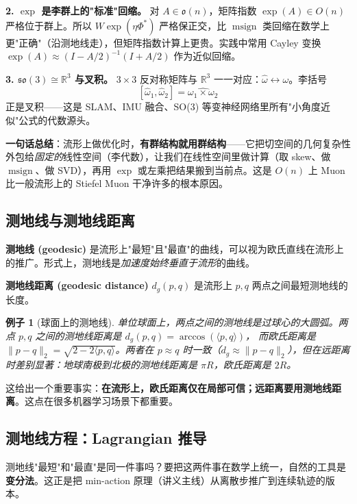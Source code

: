\documentclass[11pt,a4paper]{article}
\theoremstyle{mythm}
\theoremstyle{mydef}
\newtheorem{example}[theorem]{例子}
\newcommand{\R}{\mathbb{R}}
\newcommand{\msign}{\operatorname{msign}}
\newcommand{\inner}[2]{\langle #1, #2 \rangle}
\begin{document}
\textbf{2. $\exp$ 是李群上的"标准"回缩。}
对 $A\in\mathfrak{o}(n)$，矩阵指数 $\exp(A) \in O(n)$ 严格位于群上。所以 $W\exp(\eta\Phi^*)$ 严格保正交，比 $\msign$ 类回缩在数学上更"正确"（沿测地线走），但矩阵指数计算上更贵。实践中常用 Cayley 变换 $\exp(A) \approx (I-A/2)^{-1}(I+A/2)$ 作为近似回缩。

\textbf{3. $\mathfrak{so}(3) \cong \R^3$ 与叉积。}
$3\times 3$ 反对称矩阵与 $\R^3$ 一一对应：$\hat\omega \leftrightarrow \omega$。李括号
$$[\hat\omega_1, \hat\omega_2] = \widehat{\omega_1 \times \omega_2}$$
正是叉积——这是 SLAM、IMU 融合、SO(3) 等变神经网络里所有"小角度近似"公式的代数源头。

\medskip
\textbf{一句话总结}：流形上做优化时，\textbf{有群结构就用群结构}——它把切空间的几何复杂性外包给\emph{固定的}线性空间（李代数），让我们在线性空间里做计算（取 skew、做 $\msign$、做 SVD），再用 $\exp$ 或左乘把结果搬到当前点。这是 $O(n)$ 上 Muon 比一般流形上的 Stiefel Muon 干净许多的根本原因。

\subsection{测地线与测地线距离}

\textbf{测地线 (geodesic)} 是流形上"最短"且"最直"的曲线，可以视为欧氏直线在流形上的推广。形式上，测地线是\emph{加速度始终垂直于流形}的曲线。

\textbf{测地线距离 (geodesic distance)} $d_g(p, q)$ 是流形上 $p,q$ 两点之间最短测地线的长度。

\begin{example}[球面上的测地线]
单位球面上，两点之间的测地线是过球心的大圆弧。两点 $p,q$ 之间的测地线距离是
$d_g(p, q) = \arccos(\inner{p}{q})$，
而欧氏距离是 $\|p-q\|_2 = \sqrt{2 - 2\inner{p}{q}}$。两者在 $p\approx q$ 时一致（$d_g\approx \|p-q\|_2$），但在远距离时差别显著：地球南极到北极的测地线距离是 $\pi R$，欧氏距离是 $2R$。
\end{example}

这给出一个重要事实：\textbf{在流形上，欧氏距离仅在局部可信；远距离要用测地线距离}。这点在很多机器学习场景下都重要。

\subsection{测地线方程：Lagrangian 推导}\label{sec:geodesic-eq}

测地线"最短"和"最直"是同一件事吗？要把这两件事在数学上统一，自然的工具是\textbf{变分法}。这正是把 min-action 原理（讲义主线）从离散步推广到连续轨迹的版本。
\end{document}
